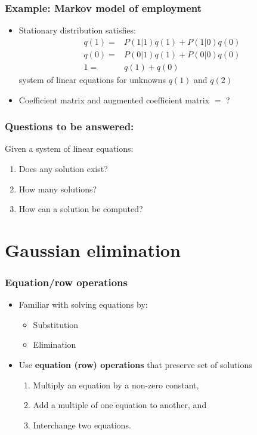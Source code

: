 \documentclass[compress]{beamer}
\begin{document}
\begin{frame}
  \frametitle{Example: Markov model of employment}
  \begin{itemize}
  \item Stationary distribution satisfies:
    \begin{align*}
      q(1) = & P(1|1) q(1) + P(1|0) q(0) \\
      q(0) = & P(0|1) q(1) + P(0|0) q(0) \\
      1 = & q(1) + q(0) 
    \end{align*}
    system of linear equations for unknowns $q(1)$ and $q(2)$
  \item Coefficient matrix and augmented coefficient matrix $=$ ?
  \end{itemize}
\end{frame}

\begin{frame}
  \frametitle{Questions to be answered:}
  Given a system of linear equations:
  \begin{enumerate}
  \item Does any solution exist?
  \item How many solutions?
  \item How can a solution be computed?
  \end{enumerate}  
\end{frame}

\section{Gaussian elimination}

\begin{frame}
  \frametitle{Equation/row operations}
  \begin{itemize}
  \item Familiar with solving equations by:
    \begin{itemize}
    \item Substitution
    \item Elimination
    \end{itemize}
  \item Use \textbf{equation (row) operations} that preserve set of
    solutions
    \begin{enumerate}
    \item Multiply an equation by a non-zero constant,
    \item Add a multiple of one equation to another, and
    \item Interchange two equations.
    \end{enumerate}
  \end{itemize}
\end{frame}
\end{document}
